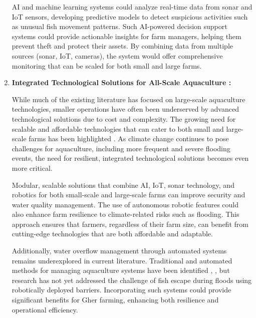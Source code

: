 \documentclass[conference]{IEEEtran}
\begin{document}
\begin{enumerate}
AI and machine learning systems could analyze real-time data from sonar and IoT sensors, developing predictive models to detect suspicious activities such as unusual fish movement patterns. Such AI-powered decision support systems could provide actionable insights for farm managers, helping them prevent theft and protect their assets. By combining data from multiple sources (sonar, IoT, cameras), the system would offer comprehensive monitoring that can be scaled for both small and large farms.

\item \textbf{Integrated Technological Solutions for All-Scale Aquaculture : }

While much of the existing literature has focused on large-scale aquaculture technologies, smaller operations have often been underserved by advanced technological solutions due to cost and complexity. The growing need for scalable and affordable technologies that can cater to both small and large-scale farms has been highlighted \cite{ref15}. As climate change continues to pose challenges for aquaculture, including more frequent and severe flooding events, the need for resilient, integrated technological solutions becomes even more critical.

Modular, scalable solutions that combine AI, IoT, sonar technology, and robotics for both small-scale and large-scale farms can improve security and water quality management. The use of autonomous robotic features could also enhance farm resilience to climate-related risks such as flooding. This approach ensures that farmers, regardless of their farm size, can benefit from cutting-edge technologies that are both affordable and adaptable.

Additionally, water overflow management through automated systems remains underexplored in current literature. Traditional and automated methods for managing aquaculture systems have been identified \cite{ref23}, \cite{ref24}, but research has not yet addressed the challenge of fish escape during floods using robotically deployed barriers. Incorporating such systems could provide significant benefits for Gher farming, enhancing both resilience and operational efficiency.

\end{enumerate}
\end{document}
